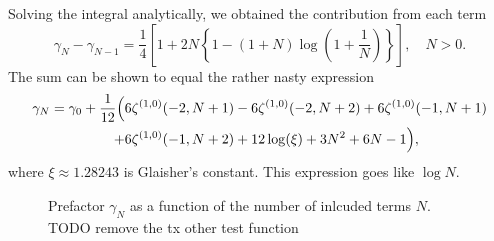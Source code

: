 Solving the integral analytically, we obtained the contribution from each term
\[
  \gamma_N - \gamma_{N-1} = \frac{1}{4} \left[
  1 + 2 N \left\{1 - (1+N) \log(1 + \frac{1}{N}) \right\} 
\right], \quad N > 0.
\]
The sum can be shown to equal the rather nasty expression
\begin{equation}
  \begin{split}
  \gamma_N = \gamma_0 + \frac{1}{12} &\Big(
    6 \zeta ^{(1,0)}(-2,N+1)
    -6 \zeta ^{(1,0)}(-2,N+2)
    +6 \zeta^{(1,0)}(-1,N+1)\\
    &\hphantom{\Big(} \mathllap{+} 6 \zeta^{(1,0)}(-1,N+2)
    +12 \log (\xi)
    +3 N^2
    +6 N
    -1
  \Big),
  \end{split}
\end{equation}
where \( \xi \approx  1.28243 \) is Glaisher's constant.
This expression goes like \( \log N \).

\begin{figure}[ht]
  \centering
  \newcommand\datafiles{notilt_contrib2.csv/0.0, notilt_contrib.csv/0.1}
  \newcommand\plottitle{Yupp}  %
  \newcommand\prefix{t_x = }
  
  \caption{Prefactor \( \gamma_N \) as a function of the number of inlcuded terms \( N \). TODO remove the tx other test function}
  \label{fig:contributions}
\end{figure}



%   


